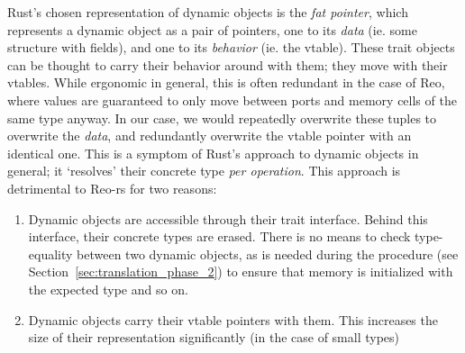 Rust's chosen representation of dynamic objects is the \textit{fat pointer}, which represents a dynamic object as a pair of pointers, one to its \textit{data} (ie. some structure with fields), and one to its \textit{behavior} (ie. the vtable). These trait objects can be thought to carry their behavior around with them; they move with their vtables. While ergonomic in general, this is often redundant in the case of Reo, where values are guaranteed to only move between ports and memory cells of the same type anyway. In our case, we would repeatedly overwrite these tuples to overwrite the \textit{data}, and redundantly overwrite the vtable pointer with an identical one. This is a symptom of Rust's approach to dynamic objects in general; it `resolves' their concrete type \textit{per operation}. This approach is detrimental to Reo-rs for two reasons:
\begin{enumerate}
	\item Dynamic objects are accessible through their trait interface. Behind this interface, their concrete types are erased. There is no means to check type-equality between two dynamic  objects, as is needed during the  procedure (see Section~\ref{sec:translation_phase_2}) to ensure that memory is initialized with the expected type and so on.
	
	\item Dynamic objects carry their vtable pointers with them. This increases the size of their representation significantly (in the case of small types)
\end{enumerate}

